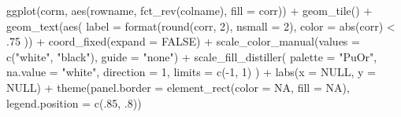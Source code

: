 \documentclass[
]{krantz}
\makeatletter
\newenvironment{Shaded}{\begin{snugshade}}{\end{snugshade}}
\newcommand{\AttributeTok}[1]{\textcolor[rgb]{0.61,0.61,0.61}{#1}}
\newcommand{\ConstantTok}[1]{\textcolor[rgb]{0,0,0}{#1}}
\newcommand{\DecValTok}[1]{\textcolor[rgb]{0.06,0.06,0.06}{#1}}
\newcommand{\FunctionTok}[1]{\textcolor[rgb]{0,0,0}{#1}}
\newcommand{\NormalTok}[1]{#1}
\newcommand{\SpecialCharTok}[1]{\textcolor[rgb]{0,0,0}{#1}}
\newcommand{\StringTok}[1]{\textcolor[rgb]{0.5,0.5,0.5}{#1}}
\newenvironment{kframe}{%
\medskip{}
\setlength{\fboxsep}{.8em}
 \def\at@end@of@kframe{}%
 \ifinner\ifhmode%
  \def\at@end@of@kframe{\end{minipage}}%
  \begin{minipage}{\columnwidth}%
 \fi\fi%
 \def\FrameCommand##1{\hskip\@totalleftmargin \hskip-\fboxsep
 \colorbox{shadecolor}{##1}\hskip-\fboxsep
     \hskip-\linewidth \hskip-\@totalleftmargin \hskip\columnwidth}%
 \MakeFramed {\advance\hsize-\width
   \@totalleftmargin\z@ \linewidth\hsize
   \@setminipage}}%
 {\par\unskip\endMakeFramed%
 \at@end@of@kframe}
\renewenvironment{Shaded}{\begin{kframe}}{\end{kframe}}
\makeatother
\begin{document}
\begin{Shaded}
\begin{Highlighting}[]
\FunctionTok{ggplot}\NormalTok{(corm, }\FunctionTok{aes}\NormalTok{(rowname, }\FunctionTok{fct\_rev}\NormalTok{(colname),}
                 \AttributeTok{fill =}\NormalTok{ corr)) }\SpecialCharTok{+}
  \FunctionTok{geom\_tile}\NormalTok{() }\SpecialCharTok{+}
  \FunctionTok{geom\_text}\NormalTok{(}\FunctionTok{aes}\NormalTok{(}
    \AttributeTok{label =} \FunctionTok{format}\NormalTok{(}\FunctionTok{round}\NormalTok{(corr, }\DecValTok{2}\NormalTok{), }\AttributeTok{nsmall =} \DecValTok{2}\NormalTok{),}
    \AttributeTok{color =} \FunctionTok{abs}\NormalTok{(corr) }\SpecialCharTok{\textless{}}\NormalTok{ .}\DecValTok{75}
\NormalTok{  )) }\SpecialCharTok{+}
  \FunctionTok{coord\_fixed}\NormalTok{(}\AttributeTok{expand =} \ConstantTok{FALSE}\NormalTok{) }\SpecialCharTok{+}
  \FunctionTok{scale\_color\_manual}\NormalTok{(}\AttributeTok{values =} \FunctionTok{c}\NormalTok{(}\StringTok{"white"}\NormalTok{, }\StringTok{"black"}\NormalTok{),}
                     \AttributeTok{guide =} \StringTok{"none"}\NormalTok{) }\SpecialCharTok{+}
  \FunctionTok{scale\_fill\_distiller}\NormalTok{(}
    \AttributeTok{palette =} \StringTok{"PuOr"}\NormalTok{, }\AttributeTok{na.value =} \StringTok{"white"}\NormalTok{,}
    \AttributeTok{direction =} \DecValTok{1}\NormalTok{, }\AttributeTok{limits =} \FunctionTok{c}\NormalTok{(}\SpecialCharTok{{-}}\DecValTok{1}\NormalTok{, }\DecValTok{1}\NormalTok{)}
\NormalTok{  ) }\SpecialCharTok{+}
  \FunctionTok{labs}\NormalTok{(}\AttributeTok{x =} \ConstantTok{NULL}\NormalTok{, }\AttributeTok{y =} \ConstantTok{NULL}\NormalTok{) }\SpecialCharTok{+}
  \FunctionTok{theme}\NormalTok{(}\AttributeTok{panel.border =} \FunctionTok{element\_rect}\NormalTok{(}\AttributeTok{color =} \ConstantTok{NA}\NormalTok{, }\AttributeTok{fill =} \ConstantTok{NA}\NormalTok{),}
        \AttributeTok{legend.position =} \FunctionTok{c}\NormalTok{(.}\DecValTok{85}\NormalTok{, .}\DecValTok{8}\NormalTok{))}
\end{Highlighting}
\end{Shaded}
\end{document}

